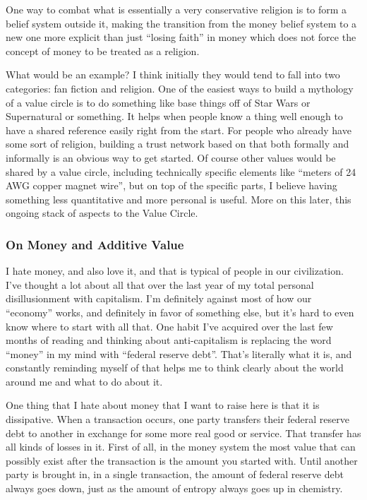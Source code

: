 One way to combat what is essentially a very conservative religion is to
form a belief system outside it, making the transition from the money
belief system to a new one more explicit than just ``losing faith'' in
money which does not force the concept of money to be treated as a
religion.

What would be an example? I think initially they would tend to fall into
two categories: fan fiction and religion. One of the easiest ways to
build a mythology of a value circle is to do something like base things
off of Star Wars or Supernatural or something. It helps when people know
a thing well enough to have a shared reference easily right from the
start. For people who already have some sort of religion, building a
trust network based on that both formally and informally is an obvious
way to get started. Of course other values would be shared by a value
circle, including technically specific elements like ``meters of 24 AWG
copper magnet wire'', but on top of the specific parts, I believe having
something less quantitative and more personal is useful. More on this
later, this ongoing stack of aspects to the Value Circle.

\subsubsection{On Money and Additive
Value}\label{on-money-and-additive-value}

I hate money, and also love it, and that is typical of people in our
civilization. I've thought a lot about all that over the last year of my
total personal disillusionment with capitalism. I'm definitely against
most of how our ``economy'' works, and definitely in favor of something
else, but it's hard to even know where to start with all that. One habit
I've acquired over the last few months of reading and thinking about
anti-capitalism is replacing the word ``money'' in my mind with
``federal reserve debt''. That's literally what it is, and constantly
reminding myself of that helps me to think clearly about the world
around me and what to do about it.

One thing that I hate about money that I want to raise here is that it
is dissipative. When a transaction occurs, one party transfers their
federal reserve debt to another in exchange for some more real good or
service. That transfer has all kinds of losses in it. First of all, in
the money system the most value that can possibly exist after the
transaction is the amount you started with. Until another party is
brought in, in a single transaction, the amount of federal reserve debt
always goes down, just as the amount of entropy always goes up in
chemistry.

